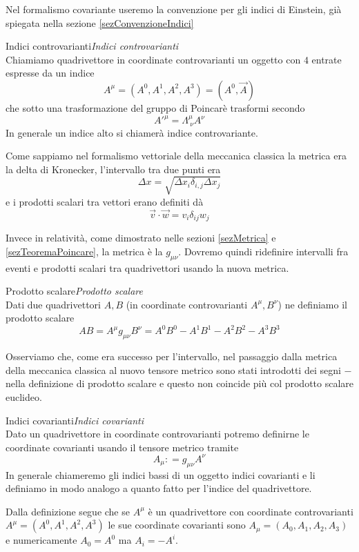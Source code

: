 \documentclass[12pt,a4paper,titlepage, twoside, openright]{book}
\newenvironment{definizione}[1][\empty]{\begin{Definizione}{
\ifx\empty#1\relax\else\mdseries\itshape#1\\\fi
}{}}{\end{Definizione}}
\numberwithin{equation}{chapter}
\begin{document}
Nel formalismo covariante useremo la convenzione per gli indici di Einstein, già spiegata nella sezione \ref{sezConvenzioneIndici}

\begin{definizione}[Indici controvarianti]
Chiamiamo quadrivettore in coordinate controvarianti un oggetto con $4$ entrate espresse da un indice
\[
A^\mu=(A^0,A^1,A^2,A^3)=(A^0,\vec{A})
\]
che sotto una trasformazione del gruppo di Poincarè trasformi secondo
\[
A'^\mu=\Lambda^\mu_{\> \nu} A^\nu
\]
In generale un indice alto si chiamerà indice controvariante.
\end{definizione}

Come sappiamo nel formalismo vettoriale della meccanica classica la metrica era la delta di Kronecker, l'intervallo tra due punti era
\[
\Delta x=\sqrt{\Delta x_i \delta_{i,j} \Delta x_j}
\]
e i prodotti scalari tra vettori erano definiti dà
\[ \vec{v}\cdot\vec{w}=v_i\delta_{ij}w_j\]

Invece in relatività, come dimostrato nelle sezioni \ref{sezMetrica} e \ref{sezTeoremaPoincare}, la metrica è la $g_{\mu\nu}$. Dovremo quindi ridefinire intervalli fra eventi e prodotti scalari tra quadrivettori usando la nuova metrica.

\begin{definizione}[Prodotto scalare]
Dati due quadrivettori $A,B$ (in coordinate controvarianti $A^\mu,B^\nu$) ne definiamo il prodotto scalare
\[
AB=A^\mu g_{\mu\nu} B^\nu = A^0B^0 -A^1B^1 -A^2B^2 - A^3B^3
\]
\end{definizione}

Osserviamo che, come era successo per l'intervallo, nel passaggio dalla metrica della meccanica classica al nuovo tensore metrico sono stati introdotti dei segni $-$ nella definizione di prodotto scalare e questo non coincide più col prodotto scalare euclideo.

\begin{definizione}[Indici covarianti]
Dato un quadrivettore in coordinate controvarianti potremo definirne le coordinate covarianti usando il tensore metrico tramite
\[
A_\mu \mathrel{\mathop:}= g_{\mu\nu}A^\nu
\]
In generale chiameremo gli indici bassi di un oggetto indici covarianti e li definiamo in modo analogo a quanto fatto per l'indice del quadrivettore.
\end{definizione}

Dalla definizione segue che se $A^\mu$ è un quadrivettore con coordinate controvarianti $A^\mu=(A^0,A^1,A^2,A^3)$ le sue coordinate covarianti sono $A_\mu=(A_0,A_1,A_2,A_3)$ e numericamente $A_0=A^0$ ma $A_i=-A^i$.
\end{document}
